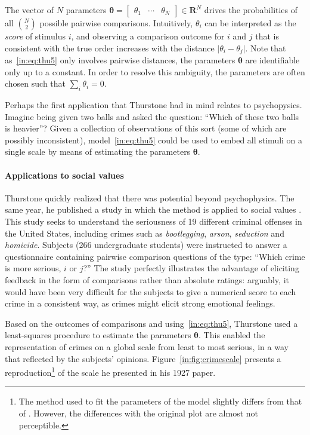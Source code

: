 The vector of $N$ parameters $\bm{\theta} = \begin{bmatrix}\theta_1 & \cdots & \theta_N\end{bmatrix} \in \mathbf{R}^N$ drives the probabilities of all $\binom{N}{2}$ possible pairwise comparisons.
Intuitively, $\theta_i$ can be interpreted as the \emph{score} of stimulus $i$, and observing a comparison outcome for $i$ and $j$ that is consistent with the true order increases with the distance $\lvert \theta_i - \theta_j \rvert$.
Note that as~\eqref{in:eq:thu5} only involves pairwise distances, the parameters $\bm{\theta}$ are identifiable only up to a constant.
In order to resolve this ambiguity, the parameters are often chosen such that $\sum_i \theta_i = 0$.

Perhaps the first application that Thurstone had in mind relates to psychopysics.
Imagine being given two balls and asked the question: ``Which of these two balls is heavier''?
Given a collection of observations of this sort (some of which are possibly inconsistent), model~\ref{in:eq:thu5} could be used to embed all stimuli on a single scale by means of estimating the parameters $\bm{\theta}$.

\paragraph{Applications to social values}
Thurstone quickly realized that there was potential beyond psychophysics.
The same year, he published a study in which the method is applied to social values \citep{thurstone1927method}.
This study seeks to understand the seriousness of \num{19} different criminal offenses in the United States, including crimes such as \emph{bootlegging}, \emph{arson}, \emph{seduction} and \emph{homicide}.
Subjects (266 undergraduate students) were instructed to answer a questionnaire containing pairwise comparison questions of the type: ``Which crime is more serious, $i$ or $j$?''
The study perfectly illustrates the advantage of eliciting feedback in the form of comparisons rather than absolute ratings:
arguably, it would have been very difficult for the subjects to give a numerical score to each crime in a consistent way, as crimes might elicit strong emotional feelings.

Based on the outcomes of comparisons and using~\eqref{in:eq:thu5}, Thurstone used a least-squares procedure to estimate the parameters $\bm{\theta}$.
This enabled the representation of crimes on a global scale from least to most serious, in a way that reflected by the subjects' opinions.
Figure~\ref{in:fig:crimescale} presents a reproduction\footnote{%
The method used to fit the parameters of the model slightly differs from that of \citet{thurstone1927method}.
However, the differences with the original plot are almost not perceptible.}
of the scale he presented in his 1927 paper.

